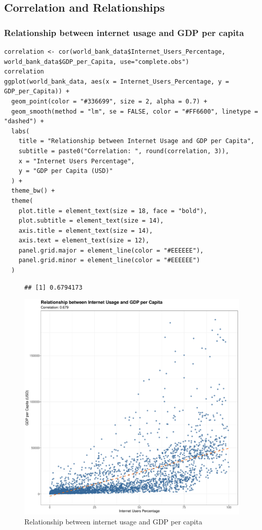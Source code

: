 \documentclass{article}\usepackage[]{graphicx}\usepackage[]{xcolor}
\makeatletter
\def\maxwidth{ %
  \ifdim\Gin@nat@width>\linewidth
    \linewidth
  \else
    \Gin@nat@width
  \fi
}
\newenvironment{kframe}{%
 \def\at@end@of@kframe{}%
 \ifinner\ifhmode%
  \def\at@end@of@kframe{\end{minipage}}%
  \begin{minipage}{\columnwidth}%
 \fi\fi%
 \def\FrameCommand##1{\hskip\@totalleftmargin \hskip-\fboxsep
 \colorbox{shadecolor}{##1}\hskip-\fboxsep
     \hskip-\linewidth \hskip-\@totalleftmargin \hskip\columnwidth}%
 \MakeFramed {\advance\hsize-\width
   \@totalleftmargin\z@ \linewidth\hsize
   \@setminipage}}%
 {\par\unskip\endMakeFramed%
 \at@end@of@kframe}
\newenvironment{knitrout}{}{} %
\makeatother
\begin{document}
\subsection{Correlation and Relationships}
\subsubsection{Relationship between internet usage and GDP per capita}
\begin{lstlisting}
correlation <- cor(world_bank_data$Internet_Users_Percentage, world_bank_data$GDP_per_Capita, use="complete.obs")
correlation
ggplot(world_bank_data, aes(x = Internet_Users_Percentage, y = GDP_per_Capita)) +
  geom_point(color = "#336699", size = 2, alpha = 0.7) +  
  geom_smooth(method = "lm", se = FALSE, color = "#FF6600", linetype = "dashed") +  
  labs(
    title = "Relationship between Internet Usage and GDP per Capita",
    subtitle = paste0("Correlation: ", round(correlation, 3)),  
    x = "Internet Users Percentage",
    y = "GDP per Capita (USD)"  
  ) +
  theme_bw() +  
  theme(
    plot.title = element_text(size = 18, face = "bold"),
    plot.subtitle = element_text(size = 14),
    axis.title = element_text(size = 14),
    axis.text = element_text(size = 12),
    panel.grid.major = element_line(color = "#EEEEEE"),
    panel.grid.minor = element_line(color = "#EEEEEE")
  )

\end{lstlisting}
\newpage
\begin{figure}[h!]
\centering
\begin{knitrout}
\color{fgcolor}\begin{kframe}
\begin{verbatim}
## [1] 0.6794173
\end{verbatim}
\end{kframe}
\includegraphics[width=\maxwidth]{figure/unnamed-chunk-14-1} 
\end{knitrout}
\caption{Relationship between internet usage and GDP per capita}
\label{fig}
\end{figure}
\end{document}

